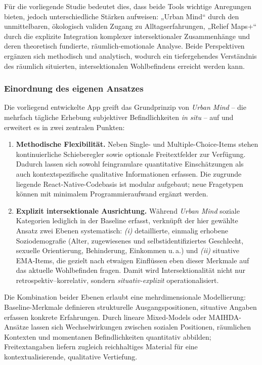 Für die vorliegende Studie bedeutet dies, dass beide Tools wichtige Anregungen bieten, jedoch unterschiedliche Stärken aufweisen: „Urban Mind“ durch den unmittelbaren, ökologisch validen Zugang zu Alltagserfahrungen, „Relief Maps+“ durch die explizite Integration komplexer intersektionaler Zusammenhänge und deren theoretisch fundierte, räumlich-emotionale Analyse. Beide Perspektiven ergänzen sich methodisch und analytisch, wodurch ein tiefergehendes Verständnis des räumlich situierten, intersektionalen Wohlbefindens erreicht werden kann.


\subsubsection{Einordnung des eigenen Ansatzes}

Die vorliegend entwickelte App greift das Grundprinzip von \emph{Urban Mind} – die mehrfach tägliche Erhebung subjektiver Befindlichkeiten \emph{in situ} – auf und erweitert es in zwei zentralen Punkten:

\begin{enumerate}
    \item \textbf{Methodische Flexibilität.} Neben Single- und Multiple-Choice-Items stehen kontinuierliche Schieberegler sowie optionale Freitextfelder zur Verfügung. Dadurch lassen sich sowohl feingranulare quantitative Einschätzungen als auch kontextspezifische qualitative Informationen erfassen. Die zugrunde liegende React-Native-Codebasis ist modular aufgebaut; neue Fragetypen können mit minimalem Programmieraufwand ergänzt werden.

    \item \textbf{Explizit intersektionale Ausrichtung.} Während \emph{Urban Mind} soziale Kategorien lediglich in der Baseline erfasst, verknüpft der hier gewählte Ansatz zwei Ebenen systematisch: \textit{(i)} detaillierte, einmalig erhobene Soziodemografie (Alter, zugewiesenes und selbstidentifiziertes Geschlecht, sexuelle Orientierung, Behinderung, Einkommen u.\,a.) und \textit{(ii)} situative EMA-Items, die gezielt nach etwaigen Einflüssen eben dieser Merkmale auf das aktuelle Wohlbefinden fragen. Damit wird Intersektionalität nicht nur retrospektiv–korrelativ, sondern \emph{situativ-explizit} operationalisiert.
\end{enumerate}

Die Kombination beider Ebenen erlaubt eine mehrdimensionale Modellierung: Baseline-Merkmale definieren strukturelle Ausgangspositionen, situative Angaben erfassen konkrete Erfahrungen. Durch lineare Mixed-Models oder MAIHDA-Ansätze lassen sich Wechselwirkungen zwischen sozialen Positionen, räumlichen Kontexten und momentanen Befindlichkeiten quantitativ abbilden; Freitextangaben liefern zugleich reichhaltiges Material für eine kontextualisierende, qualitative Vertiefung.

